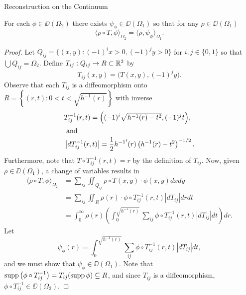 \begin{chapter}{Reconstruction on the Continuum}
\begin{lem} \label{lem:existence}
  For each $\phi\in \DD(\Omega_2)$ there exists $\psi_{\phi} \in \DD(\Omega_1)$ so that for any $\rho \in \DD(\Omega_1)$
  \begin{equation}
    \langle \rho \circ T, \phi \rangle_{\Omega_2} = \langle \rho, \psi_\phi\rangle_{\Omega_1}.
  \end{equation}
\end{lem}
\begin{proof}
  Let $Q_{ij} = \{ (x,y): (-1)^i x>0, (-1)^jy>0\}$ for $i,j \in \{0,1\}$ so that $\bigcup Q_{ij} = \Omega_2$.
  Define $T_{ij}:Q_{ij} \to R\subset \mathbb R^2$ by 
  \begin{equation}
    T_{ij}(x,y) = \Big(T(x,y), (-1)^jy\Big). 
  \end{equation}
  Observe that each $T_{ij}$ is a diffeomorphism onto $R = \left\{(r,t): 0 < t < \sqrt{h^{-1}(r)}\right\}$ with inverse 
  \begin{align}
    &T_{ij}^{-1}(r,t) = \Big((-1)^i\sqrt{h^{-1}(r) - t^2}, (-1)^jt\Big),\\
    \intertext{ and }
    &\left|dT_{ij}^{-1}(r,t)\right| = \frac12 {h^{-1}}'(r)\left(h^{-1}(r) - t^2\right)^{-1/2}. \label{eq:determinant}
  \end{align}
  Furthermore, note that $T \circ T_{ij}^{-1}(r,t) = r$ by the definition of $T_{ij}$.
  Now, given $\rho \in \DD(\Omega_1)$, a change of variables results in
  \begin{align}
    \langle \rho \circ T, \phi\rangle_{\Omega_2} 
    &= \sum_{ij}\iint_{Q_{ij}} \rho\circ T(x,y)\cdot \phi(x,y)dxdy \nonumber \\
    &= \sum_{ij}\iint_{R} \rho(r)\cdot  \phi \circ T_{ij}^{-1}(r,t)\left|dT_{ij}\right|drdt \nonumber \\
    &= \int_0^\infty \rho(r) \left(\int_0^{\sqrt{h^{-1}(r)}} \sum_{ij}\phi \circ T_{ij}^{-1}(r,t)\left|dT_{ij}\right|dt \right)dr \label{eq:phiEquation}.
  \end{align}
  Let 
  \begin{equation}
    \psi_\phi(r) = \int_0^{\sqrt{h^{-1}(r)}} \sum_{ij}\phi \circ T_{ij}^{-1}(r,t)\left|dT_{ij}\right|dt, \label{eq:psiPhiDef}
  \end{equation}
  and we must show that $\psi_\phi \in \DD(\Omega_1)$.
  Note that $\operatorname*{supp} \left(\phi \circ T_{ij}^{-1} \right) = T_{ij}( \operatorname*{supp} \phi )\subseteq R$, and since $T_{ij}$ is a diffeomorphism, $\phi \circ T_{ij}^{-1} \in \DD(\Omega_2)$. 

\end{proof}
\end{chapter}
